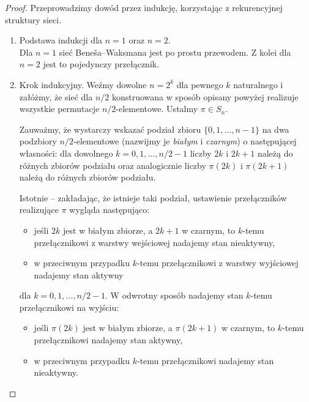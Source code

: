 \documentclass[a4paper]{article}
\theoremstyle{definition}
\begin{document}
\begin{proof}
Przeprowadzimy dowód przez indukcję, korzystając z rekurencyjnej struktury sieci. 

    \begin{enumerate} 
        \item Podstawa indukcji dla $n = 1$ oraz $n = 2$. \\
        Dla $n = 1$ sieć Beneša--Waksmana jest po prostu przewodem. Z kolei dla $n = 2$ jest to pojedynczy przełącznik.

        \item Krok indukcyjny. Weźmy dowolne $n = 2^k$ dla pewnego $k$ naturalnego i załóżmy, że sieć dla \(n/2\) konstruowana w sposób opisany powyżej realizuje wszystkie permutacje $n/2$-elementowe. 
        Ustalmy \(\pi \in S_n\).
        
        Zauważmy, że wystarczy wskazać podział zbioru \(\{0, 1, \ldots, n-1\}\) na dwa podzbiory \(n/2\)-elementowe (nazwijmy je \emph{białym} i \emph{czarnym}) o następującej własności: dla dowolnego \(k = 0, 1, \ldots, n/2 - 1\) liczby \(2k\) i \(2k+1\) należą do różnych zbiorów podziału oraz analogicznie liczby \(\pi(2k)\) i \(\pi(2k+1)\) należą do różnych zbiorów podziału.

        \vspace{.5em}

        Istotnie -- zakładając, że istnieje taki podział, ustawienie przełączników realizujące \(\pi\) wygląda następująco: 

        \begin{itemize}
            \item jeśli \(2k\) jest w białym zbiorze, a \(2k+1\) w czarnym, to \(k\)-temu przełącznikowi z warstwy wejściowej nadajemy stan nieaktywny,
            \item w przeciwnym przypadku \(k\)-temu przełącznikowi z warstwy wyjściowej nadajemy stan aktywny
        \end{itemize}
        dla \(k = 0, 1, \ldots, n/2-1\). W odwrotny sposób nadajemy stan \(k\)-temu przełącznikowi na wyjściu:
        \begin{itemize}
            \item jeśli \(\pi(2k)\) jest w białym zbiorze, a \(\pi(2k+1)\) w czarnym, to \(k\)-temu przełącznikowi nadajemy stan aktywny,
            \item w przeciwnym przypadku \(k\)-temu przełącznikowi nadajemy stan nieaktywny.  
        \end{itemize}


\end{enumerate}
\end{proof}
\end{document}
